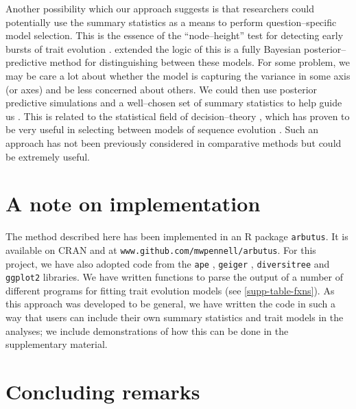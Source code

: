 \documentclass[a4paper,12pt]{article}
\begin{document}
Another possibility which our approach suggests is that researchers could potentially use the summary statistics as a means to perform question--specific model selection. This is the essence of the ``node--height'' test for detecting early bursts of trait evolution \citep{FreckletonHarvey2006}. \citet{SlaterPennell} extended the logic of this is a fully Bayesian posterior--predictive method for distinguishing between these models. For some problem, we may be care a lot about whether the model is capturing the variance in some axis (or axes) and be less concerned about others. We could then use posterior predictive simulations and a well--chosen set of summary statistics to help guide us \citep[see][]{Bollback2002}. This is related to the statistical field of decision--theory \citep[for excellent and comprehensive introductions, see][]{Berger1993, Robert2007}, which has proven to be very useful in selecting between models of sequence evolution \citep{Minin2003, SullivanJoyce2005}. Such an approach has not been previously considered in comparative methods but could be extremely useful.

\section*{A note on implementation}

The method described here has been implemented in an R package \texttt{arbutus}. It is available on CRAN and at \texttt{www.github.com/mwpennell/arbutus}. For this project, we have also adopted code from the \texttt{ape} \citep{ape}, \texttt{geiger} \citep{geiger}, \texttt{diversitree} \citep{FitzJohn2012} and \texttt{ggplot2} \citep{ggplot2} libraries. We have written functions to parse the output of a number of different programs for fitting trait evolution models (see \ref{supp-table-fxns}). As this approach was developed to be general, we have written the code in such a way that users can include their own summary statistics and trait models in the analyses; we include demonstrations of how this can be done in the supplementary material.

\section*{Concluding remarks}
\end{document}
